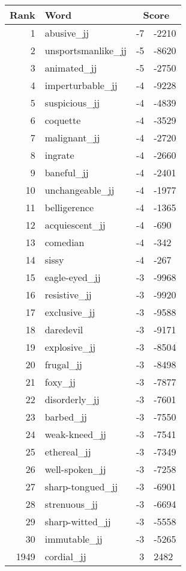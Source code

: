 \begin{longtable}[!htbp]{| rlr@{.}l |}
    \hline
    \textbf{Rank} & \textbf{Word} & \multicolumn{2}{c|}{\textbf{Score}} \\
    \hline
    \endhead
    1 & abusive\_jj & -7 & -2210 \\
    2 & unsportsmanlike\_jj & -5 & -8620 \\
    3 & animated\_jj & -5 & -2750 \\
    4 & imperturbable\_jj & -4 & -9228 \\
    5 & suspicious\_jj & -4 & -4839 \\
    6 & coquette & -4 & -3529 \\
    7 & malignant\_jj & -4 & -2720 \\
    8 & ingrate & -4 & -2660 \\
    9 & baneful\_jj & -4 & -2401 \\
    10 & unchangeable\_jj & -4 & -1977 \\
    11 & belligerence & -4 & -1365 \\
    12 & acquiescent\_jj & -4 & -690 \\
    13 & comedian & -4 & -342 \\
    14 & sissy & -4 & -267 \\
    15 & eagle-eyed\_jj & -3 & -9968 \\
    16 & resistive\_jj & -3 & -9920 \\
    17 & exclusive\_jj & -3 & -9588 \\
    18 & daredevil & -3 & -9171 \\
    19 & explosive\_jj & -3 & -8504 \\
    20 & frugal\_jj & -3 & -8498 \\
    21 & foxy\_jj & -3 & -7877 \\
    22 & disorderly\_jj & -3 & -7601 \\
    23 & barbed\_jj & -3 & -7550 \\
    24 & weak-kneed\_jj & -3 & -7541 \\
    25 & ethereal\_jj & -3 & -7349 \\
    26 & well-spoken\_jj & -3 & -7258 \\
    27 & sharp-tongued\_jj & -3 & -6901 \\
    28 & strenuous\_jj & -3 & -6694 \\
    29 & sharp-witted\_jj & -3 & -5558 \\
    30 & immutable\_jj & -3 & -5265 \\
    1949 & cordial\_jj & 3 & 2482 \\

\end{longtable}
